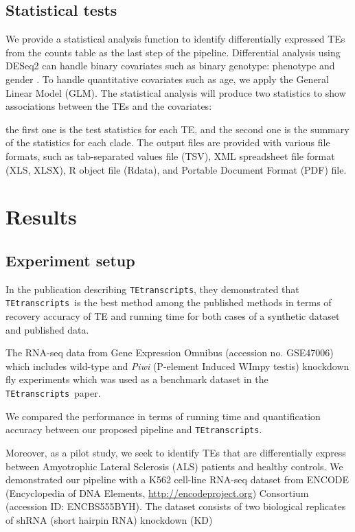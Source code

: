 \documentclass[wsdraft]{ws-procs11x85}
\newcommand{\TEtranscripts}{\texttt{TEtranscripts}}
\begin{document}
\subsection{Statistical tests}
We provide a statistical analysis function to identify differentially expressed TEs from the counts table as the last step of the pipeline. 
Differential analysis using DESeq2 can handle  binary covariates such as binary genotype: phenotype and gender \cite{love2014moderated}. To handle quantitative covariates such as age, we apply the General Linear Model (GLM)\cite{johnston1980multivariate}. The statistical analysis will produce two statistics to show associations between the TEs and the covariates:

the first one is the test statistics for each TE, and the second one is the summary of the statistics for each clade. 
The output files are provided with various file formats, such as tab-separated values file (TSV), XML spreadsheet file format (XLS, XLSX), R object file (Rdata), and Portable Document Format (PDF) file.

\section{Results}

\subsection{Experiment setup}
In the publication describing \TEtranscripts, they demonstrated that \TEtranscripts~is the best method among the published methods in terms of recovery accuracy of TE and running time for both cases of a synthetic dataset and published data.\cite{jin2015tetranscripts} 

The RNA-seq data from Gene Expression Omnibus (accession no. GSE47006)
which includes wild-type and \textit{Piwi} (P-element Induced WImpy testis) knockdown fly experiments
which was used as a benchmark dataset in the \TEtranscripts~paper.\cite{ohtani2013dmgtsf1}


We compared  the performance in terms of running time and quantification accuracy between our proposed pipeline and \TEtranscripts.

Moreover, as a pilot study, we seek to identify TEs that are  differentially express between Amyotrophic Lateral Sclerosis (ALS) patients and healthy  controls.
We demonstrated our pipeline with a K562 cell-line RNA-seq dataset from ENCODE (Encyclopedia of DNA Elements, \url{http://encodeproject.org})  Consortium (accession ID: ENCBS555BYH).\cite{encode2012integrated}
The dataset consists of two biological replicates of shRNA (short hairpin RNA) knockdown (KD)
\end{document}

